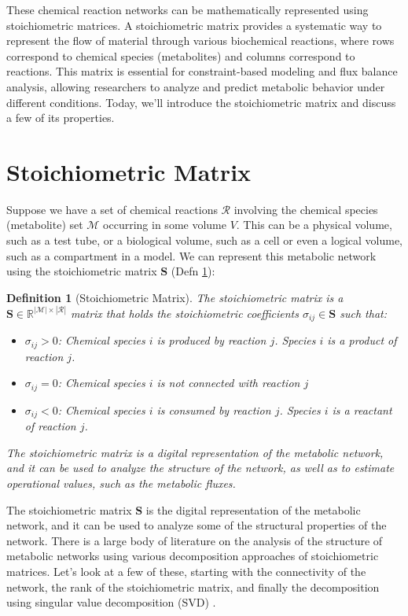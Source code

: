 \documentclass{article}[11pt]
\newtheorem{defn}{Definition}
\begin{document}
These chemical reaction networks can be mathematically represented using stoichiometric matrices. 
A stoichiometric matrix provides a systematic way to represent the flow of material through various biochemical reactions, where rows correspond to chemical species (metabolites) and columns correspond to reactions. 
This matrix is essential for constraint-based modeling and flux balance analysis, allowing researchers to analyze and predict metabolic behavior under different conditions. 
Today, we'll introduce the stoichiometric matrix and discuss a few of its properties.

\section{Stoichiometric Matrix}
Suppose we have a set of chemical reactions $\mathcal{R}$ involving the chemical species (metabolite) set $\mathcal{M}$ occurring in some volume $V$.
This can be a physical volume, such as a test tube, or a biological volume, such as a cell or even a logical volume, such as a compartment in a model.
We can represent this metabolic network using the stoichiometric matrix $\mathbf{S}$ (Defn \ref{defn-stoichiometric-matrix}):

\begin{defn}[Stoichiometric Matrix]\label{defn-stoichiometric-matrix}
The stoichiometric matrix is a $\mathbf{S}\in\mathbb{R}^{|\mathcal{M}|\times|\mathcal{R}|}$ matrix that holds the stoichiometric coefficients $\sigma_{ij}\in\mathbf{S}$ such that:
   \begin{itemize}[leftmargin=16pt]
      \item{$\sigma_{ij}>0$: Chemical species $i$ is \textit{produced} by reaction $j$. Species $i$ is a product of reaction $j$.}
      \item{$\sigma_{ij} = 0$: Chemical species $i$ is not connected with reaction $j$}
      \item{$\sigma_{ij}<0$: Chemical species $i$ is \textit{consumed} by reaction $j$. Species $i$ is a reactant of reaction $j$.}
   \end{itemize}
   The stoichiometric matrix is a digital representation of the metabolic network, and it can be used to analyze the structure of the network, 
   as well as to estimate operational values, such as the metabolic fluxes.
\end{defn}

The stoichiometric matrix $\mathbf{S}$ is the digital representation of the metabolic network, and it can be used to analyze some of the structural properties of the network.
There is a large body of literature on the analysis of the structure of metabolic networks using various decomposition approaches of stoichiometric matrices. 
Let's look at a few of these, starting with the connectivity of the network, the rank of the stoichiometric matrix, 
and finally the decomposition using singular value decomposition (SVD) \cite{Famili:2003aa}.
\end{document}
